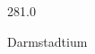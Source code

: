 \documentclass[12pt]{article}
\begin{document}
\hfill{}
\vfill
\begin{center}
  {\fontsize{50}{60}
  }

  \vspace{1em}

  281.0

Darmstadtium
\end{center}
\vfill
\end{document}
